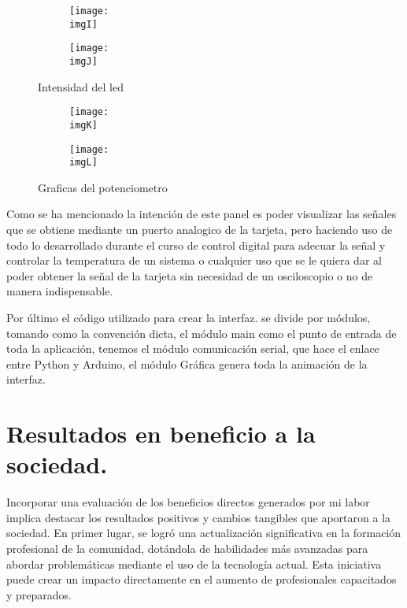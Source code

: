 \documentclass[a4paper,12pt]{article}
\newcommand{\imgI}{img/bajito.jpg}
\newcommand{\imgJ}{img/alto.jpg}
\newcommand{\imgK}{img/potes.png}
\newcommand{\imgL}{img/ruido.png}
\newcommand{\main}{code/main.py}
\newcommand{\graff}{code/Grafica.py}
\newcommand{\serial}{code/ComunicacionSerial.py}
\begin{document}
        \begin{figure}[H] 
            \centering 
            \begin{subfigure}{0.45\linewidth} 
                \texttt{[image: \\imgI]} 
            \end{subfigure} 
            \begin{subfigure}{0.45\textwidth} 
                \texttt{[image: \\imgJ]} 
            \end{subfigure} 
            \caption{Intensidad del led} 
            \label{fig:intensidad}
        \end{figure} 

        \begin{figure}[H] 
            \centering 
            \begin{subfigure}{0.45\linewidth} 
                \texttt{[image: \\imgK]} 
            \end{subfigure} 
            \begin{subfigure}{0.45\textwidth} 
                \texttt{[image: \\imgL]} 
            \end{subfigure} 
            \caption{Graficas del potenciometro} 
        \end{figure} 

        Como se ha mencionado la intención de este panel es poder visualizar las señales que se obtiene mediante un puerto analogico de la tarjeta, pero haciendo uso de todo lo desarrollado durante el curso de control digital para adecuar la señal y controlar la temperatura de un sistema o cualquier uso que se le quiera dar al poder obtener la señal de la tarjeta sin necesidad de un osciloscopio o no de manera indispensable.

        Por último el código utilizado para crear la interfaz. se divide por módulos, tomando como la convención dicta, el módulo main como el punto de entrada de toda la aplicación, tenemos el módulo comunicación serial, que hace el enlace entre Python y Arduino, el módulo Gráfica genera toda la animación de la interfaz.\cite{meier2019python}

        
        
        

    \section{Resultados en beneficio a la sociedad.}
        Incorporar una evaluación de los beneficios directos generados por mi labor implica destacar los resultados positivos y cambios tangibles que aportaron a la sociedad. En primer lugar, se logró una actualización significativa en la formación profesional de la comunidad, dotándola de habilidades más avanzadas para abordar problemáticas mediante el uso de la tecnología actual. Esta iniciativa puede crear un impacto directamente en el aumento de profesionales capacitados y preparados.
\end{document}
